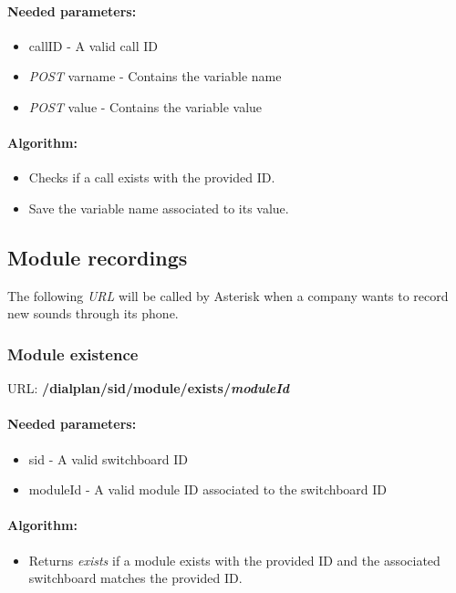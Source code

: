 \paragraph{Needed parameters:}
\begin{itemize}
\item {callID} - A valid call ID
\item \textit{POST} {varname} - Contains the variable name
\item \textit{POST} {value} - Contains the variable value
\end{itemize}


\paragraph{Algorithm:}
\begin{itemize}
	\item Checks if a call exists with the provided ID.
	\item Save the variable name associated to its value.

\end{itemize}



\subsection{Module recordings}
The following \textit{URL} will be called by Asterisk when a company wants to record new sounds through its phone.
\newline 
 
\subsubsection{Module existence}

URL: \textbf{/dialplan/{sid}/module/exists/{\textit{moduleId}}}

\paragraph{Needed parameters:}
\begin{itemize}
\item {sid} - A valid switchboard ID
\item {moduleId} - A valid module ID associated to the switchboard ID
\end{itemize}


\paragraph{Algorithm:}
\begin{itemize}
	\item Returns \textit{exists} if a module exists with the provided ID and the associated switchboard matches the provided ID.

\end{itemize}

